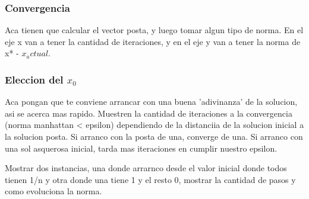 \subsubsection{Convergencia}
Aca tienen que calcular el vector posta, y luego tomar algun tipo de norma. En el eje x van a tener la cantidad de iteraciones, y en el eje y van a tener la norma de x* - $x_actual$.

\subsubsection{Eleccion del $x_0$}

Aca pongan que te conviene arrancar con una buena 'adivinanza' de la solucion, asi se acerca mas rapido. Muestren la cantidad de iteraciones a la convergencia (norma manhattan < epsilon) dependiendo de la distanciia de la solucion inicial a la solucion posta. Si arranco con la posta de una, converge de una. Si arranco con una sol asquerosa inicial, tarda mas iteraciones en cumplir nuestro epsilon.

Mostrar dos instancias, una donde arrarnco desde el valor inicial donde todos tienen 1/n y otra donde una tiene 1 y el resto 0, mostrar la cantidad de pasos y como evoluciona la norma.


